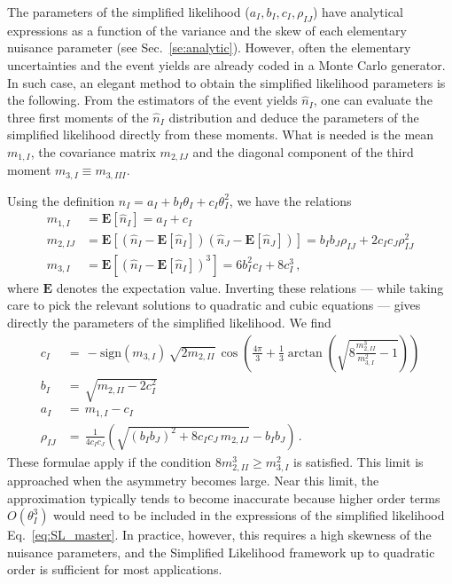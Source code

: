 \documentclass[11pt]{article}
\begin{document}
The parameters of the simplified likelihood ($a_I, b_I, c_I, \rho_{IJ}$) have analytical expressions
as a function of the variance and the skew  of each elementary nuisance parameter (see Sec.~\ref{se:analytic}). However, often the elementary uncertainties and the event yields are already coded in a Monte Carlo generator. In such case, %
an elegant method to obtain the simplified likelihood parameters  is the following. From the estimators of the event yields $\hat n_I$, one can evaluate the three first moments of the $\hat n_I$ distribution and deduce the parameters of the simplified likelihood directly from these moments.
What is needed is the mean $m_{1,I}$, the covariance matrix $m_{2,IJ}$ and the diagonal component of the third moment $m_{3,I} \equiv m_{3,III}$. %

Using the definition $ n_I= a_I+b_I \theta_I+c_I \theta_I^2 $, we have the relations
%
\begin{align} \label{eq:moments1}
  m_{1,I} &= \mathbf{E}[\hat n_I]= a_I+c_I\\
  m_{2,IJ} &= \mathbf{E}[(\hat n_I - \mathbf{E}[\hat n_I])(\hat n_J - \mathbf{E}[\hat n_J]) ]= b_I b_J \rho_{IJ}+2 c_I c_J\rho_{IJ}^2\\
  m_{3,I} &= \mathbf{E}[(\hat n_I - \mathbf{E}[\hat n_I])^3 ]=   6 b_I^2 c_I+8 c_I^3 \, ,
  \label{eq:moments2}
\end{align}
%
where $\mathbf{E}$ denotes the expectation value.
Inverting these relations --- while taking care to pick the relevant solutions to quadratic and cubic equations --- gives directly the parameters of the simplified likelihood.  We find
%
\begin{align}
c_I &= \, -\mathrm{sign}(m_{3,I}) \, \sqrt{2 m_{2,II}} \, \cos\!\left(\frac{4\pi}{3}+\frac{1}{3}\arctan\left(\sqrt{8 \frac{m^3_{2,II}}{m^2_{3,I}}-1}\right)  \right) \label{eq:solutions1}
\\
b_I &= \, \sqrt{m_{2,II}-2 c_I^2 }\\
a_I &= \, m_{1,I}- c_I\\
\rho_{IJ} &= \, \frac{1}{4 c_I c_J}\left( \sqrt{(b_I b_J)^2+8 c_I c_J\,m_{2,IJ}}-b_I b_J \right) \, .
\label{eq:solutions2}
\end{align}
%
These formulae apply if the condition $8 m_{2,II}^3\geq m_{3,I}^2$ is satisfied. This limit is approached when the asymmetry becomes large. Near this limit, the approximation typically tends to become inaccurate because higher order terms $O(\theta_I^3)$  would need to be included in the expressions of the  simplified likelihood Eq.~\eqref{eq:SL_master}. In practice, however, this requires a high skewness of the nuisance parameters, and the Simplified Likelihood framework up to quadratic order is sufficient for most applications.
\end{document}
